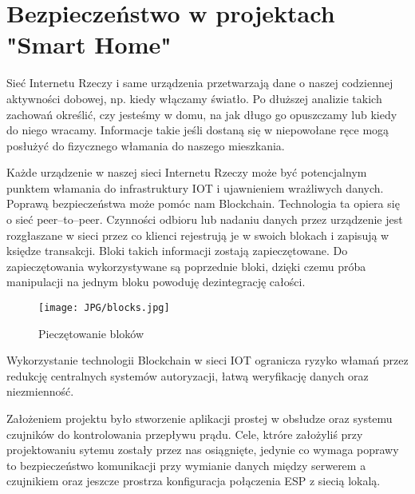 \documentclass{xmgr}
\begin{document}
\section{Bezpieczeństwo w projektach "Smart Home"}

Sieć Internetu Rzeczy i same urządzenia przetwarzają dane o naszej codziennej aktywności dobowej, np. kiedy włączamy światło. Po dłuższej analizie takich zachowań określić, czy jesteśmy w domu, na jak długo go opuszczamy lub kiedy do niego wracamy. Informacje takie jeśli dostaną się w niepowołane ręce mogą posłużyć do fizycznego włamania do naszego mieszkania.

Każde urządzenie w naszej sieci Internetu Rzeczy może być potencjalnym punktem włamania do infrastruktury IOT i ujawnieniem wrażliwych danych. Poprawą bezpieczeństwa może pomóc nam Blockchain\cite{blockchain:2017:blockchain}\cite{blockchain:2018:intel}. Technologia ta opiera się o sieć peer--to--peer. Czynności odbioru lub nadaniu danych przez urządzenie jest rozgłaszane w sieci przez co klienci rejestrują je w swoich blokach i zapisują w księdze transakcji. Bloki takich informacji zostają zapieczętowane. Do zapieczętowania wykorzystywane są poprzednie bloki, dzięki czemu próba manipulacji na jednym bloku powoduję dezintegrację całości.
\begin{figure}[h]
\texttt{[image: JPG/blocks.jpg]}
\caption{Pieczętowanie bloków}
\end{figure}

Wykorzystanie technologii Blockchain\cite{blockchain:2018:ibm} w sieci IOT ogranicza ryzyko włamań przez redukcję centralnych systemów autoryzacji, łatwą weryfikację danych oraz niezmienność.


\summary
Założeniem projektu było stworzenie aplikacji prostej w obsłudze oraz systemu czujników do kontrolowania przepływu prądu. Cele, ktróre założyliś przy projektowaniu sytemu  zostały przez nas osiągnięte, jedynie co wymaga poprawy to bezpieczeństwo  komunikacji przy wymianie danych między serwerem a czujnikiem oraz jeszcze prostrza konfiguracja połączenia ESP z siecią lokalą. 




\listoffigures

\oswiadczenie
\end{document}
